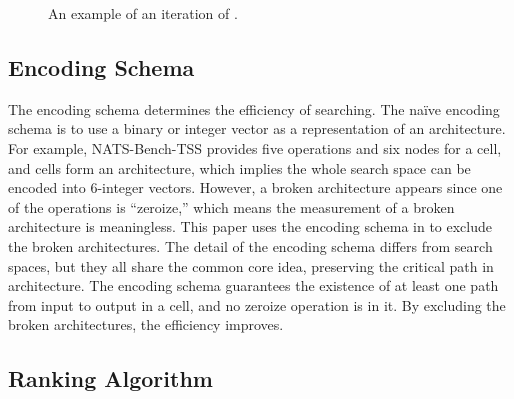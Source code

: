 \documentclass[sigconf]{acmart}
\begin{document}
    \begin{figure}[htb]
        \begin{center}
            \caption{An example of an iteration of \palg{}.}
            \label{fig:SA-rank-iteration}
        \end{center}
    \end{figure}

    \subsection{Encoding Schema}

    The encoding schema determines the efficiency of searching. The naïve encoding 
    schema is to use a binary or integer vector as a representation of an architecture. 
    For example, NATS-Bench-TSS provides five operations and six nodes for a cell, 
    and cells form an architecture, which implies the whole search space can be 
    encoded into 6-integer vectors. However, a broken architecture appears since 
    one of the operations is ``zeroize,'' which means the measurement of a broken 
    architecture is meaningless. This paper uses the encoding schema in \cite{10092788} 
    to exclude the broken architectures. The detail of the encoding schema differs from 
    search spaces, but they all share the common core idea, preserving the critical path 
    in architecture. The encoding schema guarantees the existence of at least one path 
    from input to output in a cell, and no zeroize operation is in it. By excluding the 
    broken architectures, the efficiency improves. 

    \subsection{Ranking Algorithm}
\end{document}
